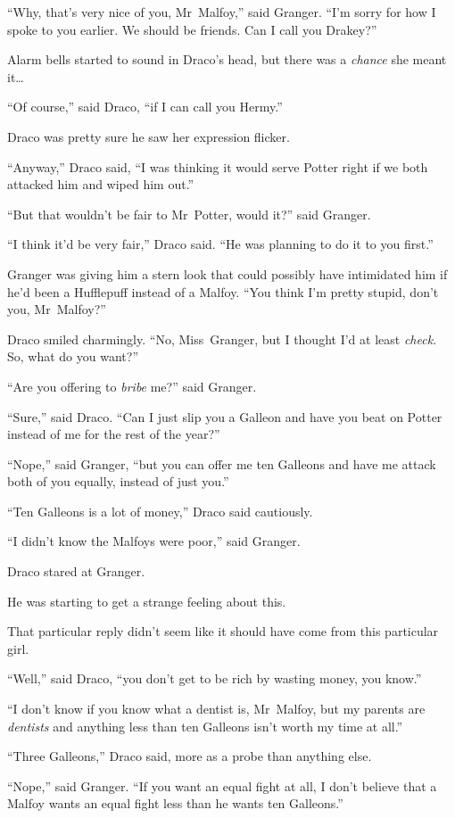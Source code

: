 “Why, that’s very nice of you, Mr~Malfoy,” said Granger. “I’m sorry for how I spoke to you earlier. We should be friends. Can I call you Drakey?”

Alarm bells started to sound in Draco’s head, but there was a \emph{chance} she meant it…

“Of course,” said Draco, “if I can call you Hermy.”

Draco was pretty sure he saw her expression flicker.

“Anyway,” Draco said, “I was thinking it would serve Potter right if we both attacked him and wiped him out.”

“But that wouldn’t be fair to Mr~Potter, would it?” said Granger.

“I think it’d be very fair,” Draco said. “He was planning to do it to you first.”

Granger was giving him a stern look that could possibly have intimidated him if he’d been a Hufflepuff instead of a Malfoy. “You think I’m pretty stupid, don’t you, Mr~Malfoy?”

Draco smiled charmingly. “No, Miss~Granger, but I thought I’d at least \emph{check.} So, what do you want?”

“Are you offering to \emph{bribe} me?” said Granger.

“Sure,” said Draco. “Can I just slip you a Galleon and have you beat on Potter instead of me for the rest of the year?”

“Nope,” said Granger, “but you can offer me ten Galleons and have me attack both of you equally, instead of just you.”

“Ten Galleons is a lot of money,” Draco said cautiously.

“I didn’t know the Malfoys were poor,” said Granger.

Draco stared at Granger.

He was starting to get a strange feeling about this.

That particular reply didn’t seem like it should have come from this particular girl.

“Well,” said Draco, “you don’t get to be rich by wasting money, you know.”

“I don’t know if you know what a dentist is, Mr~Malfoy, but my parents are \emph{dentists} and anything less than ten Galleons isn’t worth my time at all.”

“Three Galleons,” Draco said, more as a probe than anything else.

“Nope,” said Granger. “If you want an equal fight at all, I don’t believe that a Malfoy wants an equal fight less than he wants ten Galleons.”

